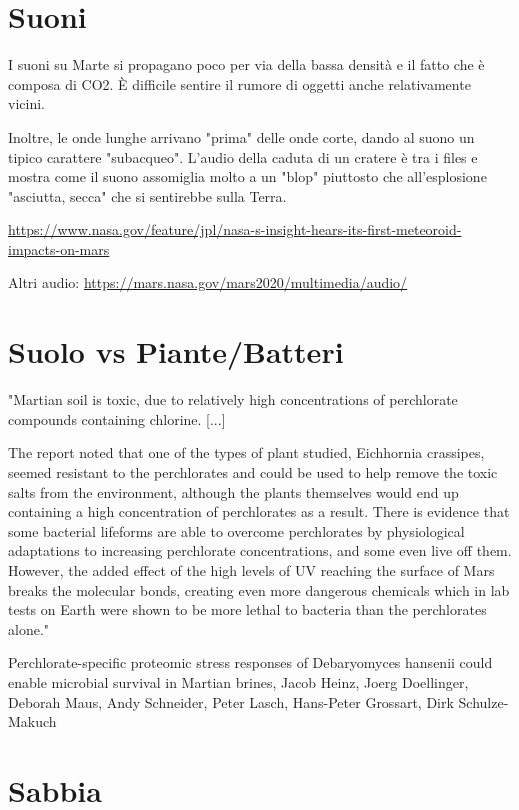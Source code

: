 \documentclass[a4paper,10pt,openany,oneside]{memoir}
\begin{document}
\section{Suoni}

I suoni su Marte si propagano poco per via della bassa densità e il fatto che è composa di CO2. È difficile sentire il rumore di oggetti anche relativamente vicini.

Inoltre, le onde lunghe arrivano "prima" delle onde corte, dando al suono un tipico carattere "subacqueo". L'audio della caduta di un cratere è tra i files e mostra come il suono assomiglia molto a un "blop" piuttosto che all'esplosione "asciutta, secca" che si sentirebbe sulla Terra.

\url{https://www.nasa.gov/feature/jpl/nasa-s-insight-hears-its-first-meteoroid-impacts-on-mars}

Altri audio: \url{https://mars.nasa.gov/mars2020/multimedia/audio/}



\section{Suolo vs Piante/Batteri}

"Martian soil is toxic, due to relatively high concentrations of perchlorate compounds containing chlorine. [...]

The report noted that one of the types of plant studied, Eichhornia crassipes, seemed resistant to the perchlorates and could be used to help remove the toxic salts from the environment, although the plants themselves would end up containing a high concentration of perchlorates as a result. There is evidence that some bacterial lifeforms are able to overcome perchlorates by physiological adaptations to increasing perchlorate concentrations, and some even live off them. However, the added effect of the high levels of UV reaching the surface of Mars breaks the molecular bonds, creating even more dangerous chemicals which in lab tests on Earth were shown to be more lethal to bacteria than the perchlorates alone."

Perchlorate-specific proteomic stress responses of Debaryomyces hansenii could enable microbial survival in Martian brines, Jacob Heinz, Joerg Doellinger, Deborah Maus, Andy Schneider, Peter Lasch, Hans-Peter Grossart, Dirk Schulze-Makuch


\section{Sabbia}
\end{document}
